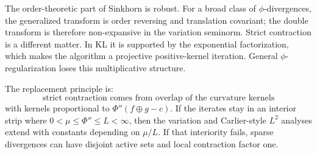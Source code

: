 \documentclass[11pt]{article}
\begin{document}
The order-theoretic part of Sinkhorn is robust.  For a broad class of
$\phi$-divergences, the generalized transform is order reversing and
translation covariant; the double transform is therefore non-expansive in the
variation seminorm.  Strict contraction is a different matter.  In KL it is
supported by the exponential factorization, which makes the algorithm a
projective positive-kernel iteration.  General $\phi$-regularization loses this
multiplicative structure.

The replacement principle is:
\begin{equation*}
  \boxed{\text{strict contraction comes from overlap of the curvature kernels}}
\end{equation*}
with kernels proportional to $\Phi''(f\oplus g-c)$.  If the iterates stay in an
interior strip where $0<\mu\leq \Phi''\leq L<\infty$, then the variation and
Carlier-style $L^2$ analyses extend with constants depending on $\mu/L$.  If
that interiority fails, sparse divergences can have disjoint active sets and
local contraction factor one.
\end{document}
